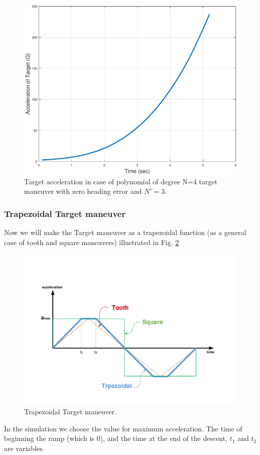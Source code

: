 \begin{figure}[H]
	\centering
	\includegraphics[scale = 0.35]{fig/TargetAccelerationP4N3.pdf}
	\caption{Target acceleration in case of  polynomial of degree N=4 target maneuver with zero heading error and $N'=3$.}
	\label{Target accelerationP4N3}
\end{figure}



\subsubsection{Trapezoidal Target maneuver}
Now we will make the Target maneuver as a trapezoidal function (as a general case of tooth and square maneuvers) illustrated in Fig. \ref{trapezoidalacc}


\begin{figure}[htb]
	\centering
	\includegraphics[scale = 0.60]{fig/toothSquareTrapezoidal.pdf}
	\caption{Trapezoidal Target maneuver.}
	\label{trapezoidalacc}
\end{figure}
In the simulation we choose the value for maximum acceleration. The time of beginning the ramp (which is 0), and the time at the end of the descent, $t_1$ and $t_2$ are variables. 

